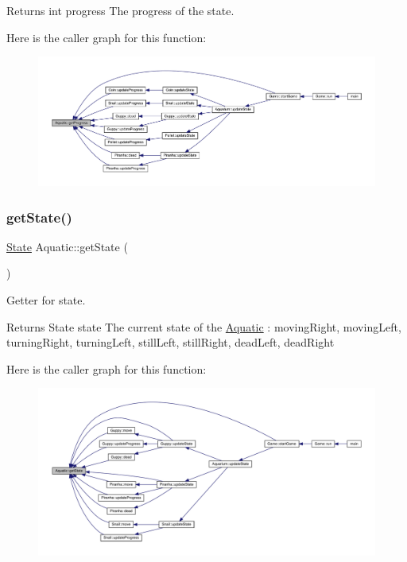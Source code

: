 \begin{DoxyReturn}{Returns}
int progress The progress of the state. 
\end{DoxyReturn}
Here is the caller graph for this function\+:\nopagebreak
\begin{figure}[H]
\begin{center}
\leavevmode
\includegraphics[width=350pt]{class_aquatic_a0de76e489d82ccad52dec32a1978850c_icgraph}
\end{center}
\end{figure}
\mbox{\label{class_aquatic_a3d73a0494585841ebd2acaee7281ece5}} 
\subsubsection{\texorpdfstring{get\+State()}{getState()}}
{\footnotesize\ttfamily \mbox{\hyperlink{_constants_8hpp_a5d74787dedbc4e11c1ab15bf487e61f8}{State}} Aquatic\+::get\+State (\begin{DoxyParamCaption}{ }\end{DoxyParamCaption})}



Getter for state. 

\begin{DoxyReturn}{Returns}
State state The current state of the \mbox{\hyperlink{class_aquatic}{Aquatic}} \+: moving\+Right, moving\+Left, turning\+Right, turning\+Left, still\+Left, still\+Right, dead\+Left, dead\+Right 
\end{DoxyReturn}
Here is the caller graph for this function\+:\nopagebreak
\begin{figure}[H]
\begin{center}
\leavevmode
\includegraphics[width=350pt]{class_aquatic_a3d73a0494585841ebd2acaee7281ece5_icgraph}
\end{center}
\end{figure}
\mbox{\label{class_aquatic_ab59ba97a4876a0e3ae8b85c1915a82f9}} 
